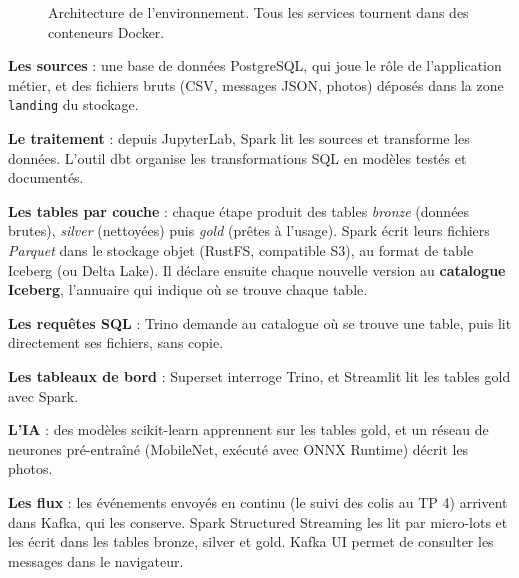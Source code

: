 \begin{figure}[H]
{}
\caption{Architecture de l'environnement. Tous les services tournent dans des conteneurs Docker.}
\label{c2:fig:archi}
\end{figure}

\begin{description}[leftmargin=1.4em,labelindent=0pt,itemsep=3pt,font=\normalfont]
\item[\pastilletexte{1}] \textbf{Les sources} : une base de données PostgreSQL, qui joue le rôle de
  l'application métier, et des fichiers bruts (CSV, messages JSON, photos) déposés dans la zone
  \texttt{landing} du stockage.
\item[\pastilletexte{2}] \textbf{Le traitement} : depuis JupyterLab, Spark lit les sources et
  transforme les données. L'outil dbt organise les transformations SQL en modèles testés et documentés.
\item[\pastilletexte{3}] \textbf{Les tables par couche} : chaque étape produit des tables
  \emph{bronze} (données brutes), \emph{silver} (nettoyées) puis \emph{gold} (prêtes à l'usage).
  Spark écrit leurs fichiers \emph{Parquet} dans le stockage objet (RustFS, compatible S3), au
  format de table Iceberg (ou Delta Lake). Il déclare ensuite chaque nouvelle version au
  \textbf{catalogue Iceberg}, l'annuaire qui indique où se trouve chaque table.
\item[\pastilletexte{4}] \textbf{Les requêtes SQL} : Trino demande au catalogue où se trouve une
  table, puis lit directement ses fichiers, sans copie.
\item[\pastilletexte{5}] \textbf{Les tableaux de bord} : Superset interroge Trino, et Streamlit lit
  les tables gold avec Spark.
\item[\pastilletexte{6}] \textbf{L'IA} : des modèles scikit-learn apprennent sur les tables gold, et
  un réseau de neurones pré-entraîné (MobileNet, exécuté avec ONNX Runtime) décrit les photos.
\item[\pastilletexte{7}] \textbf{Les flux} : les événements envoyés en continu (le suivi des colis
  au TP 4) arrivent dans Kafka, qui les conserve. Spark Structured Streaming les lit par
  micro-lots et les écrit dans les tables bronze, silver et gold. Kafka UI permet de consulter les
  messages dans le navigateur.
\end{description}

